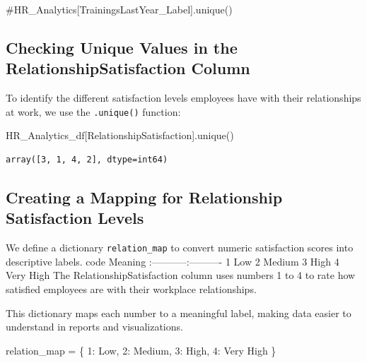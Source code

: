 \documentclass[
  letterpaper,
  DIV=11,
  numbers=noendperiod]{scrartcl}
\newenvironment{Shaded}{\begin{snugshade}}{\end{snugshade}}
\newcommand{\CommentTok}[1]{\textcolor[rgb]{0.37,0.37,0.37}{#1}}
\newcommand{\DecValTok}[1]{\textcolor[rgb]{0.68,0.00,0.00}{#1}}
\newcommand{\NormalTok}[1]{\textcolor[rgb]{0.00,0.23,0.31}{#1}}
\newcommand{\OperatorTok}[1]{\textcolor[rgb]{0.37,0.37,0.37}{#1}}
\newcommand{\StringTok}[1]{\textcolor[rgb]{0.13,0.47,0.30}{#1}}
\begin{document}
\begin{Shaded}
\begin{Highlighting}[]
\CommentTok{\#HR\_Analytics[\textquotesingle{}TrainingsLastYear\_Label\textquotesingle{}].unique()}
\end{Highlighting}
\end{Shaded}

\subsection{Checking Unique Values in the RelationshipSatisfaction
Column}\label{checking-unique-values-in-the-relationshipsatisfaction-column}

To identify the different satisfaction levels employees have with their
relationships at work, we use the \texttt{.unique()} function:

\begin{Shaded}
\begin{Highlighting}[]
\NormalTok{HR\_Analytics\_df[}\StringTok{\textquotesingle{}RelationshipSatisfaction\textquotesingle{}}\NormalTok{].unique()}
\end{Highlighting}
\end{Shaded}

\begin{verbatim}
array([3, 1, 4, 2], dtype=int64)
\end{verbatim}

\subsection{Creating a Mapping for Relationship Satisfaction
Levels}\label{creating-a-mapping-for-relationship-satisfaction-levels}

We define a dictionary \texttt{relation\_map} to convert numeric
satisfaction scores into descriptive labels. \textbar{} code \textbar{}
Meaning \textbar{} \textbar:-----------\textbar:----------\textbar{}
\textbar{} 1 \textbar Low\textbar{} \textbar{} 2 \textbar{}
Medium\textbar{} \textbar{} 3 \textbar{} High\textbar{} \textbar{} 4
\textbar{} Very High\textbar{} The RelationshipSatisfaction column uses
numbers 1 to 4 to rate how satisfied employees are with their workplace
relationships.

This dictionary maps each number to a meaningful label, making data
easier to understand in reports and visualizations.

\begin{Shaded}
\begin{Highlighting}[]
\NormalTok{relation\_map }\OperatorTok{=}\NormalTok{ \{}
    \DecValTok{1}\NormalTok{: }\StringTok{\textquotesingle{}Low\textquotesingle{}}\NormalTok{,}
    \DecValTok{2}\NormalTok{: }\StringTok{\textquotesingle{}Medium\textquotesingle{}}\NormalTok{,}
    \DecValTok{3}\NormalTok{: }\StringTok{\textquotesingle{}High\textquotesingle{}}\NormalTok{,}
    \DecValTok{4}\NormalTok{: }\StringTok{\textquotesingle{}Very High\textquotesingle{}}
\NormalTok{\}}
\end{Highlighting}
\end{Shaded}
\end{document}
